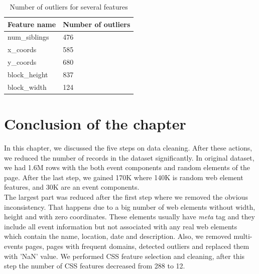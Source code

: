 \begin{table}[h]
\begin{center}
{\renewcommand{\arraystretch}{1.5}
\begin{tabular}{| p{5cm} | p{5cm}|}
\hline
\textbf{Feature name}    & \textbf{Number of outliers}\\
\hline
num\_siblings    & 476\\
\hline
x\_coords    & 585\\
\hline
y\_coords    & 680\\
\hline
block\_height    & 837\\
\hline
block\_width    & 124\\
\hline
\end{tabular}}
\caption{Number of outliers for several features}
\label{table:outlier}
\end{center}
\end{table}



\section*{Conclusion of the chapter}
In this chapter, we discussed the five steps on data cleaning. After these actions, we reduced the number of records in the dataset significantly. In original dataset, we had 1.6M rows with the both event components and random elements of the page. After the last step, we gained 170K where 140K is random web element features, and 30K are an event components.\\

The largest part was reduced after the first step where we removed the obvious inconsistency. That happens due to a big number of web elements without width, height and with zero coordinates. These elements usually have \textit{meta} tag and they include all event information but not associated with any real web elements which contain the name, location, date and description. Also, we removed multi-events pages, pages with frequent domains, detected outliers and replaced them with 'NaN' value. We performed CSS feature selection and cleaning, after this step the number of CSS features decreased from 288 to 12.